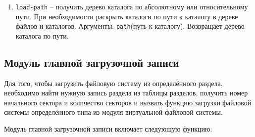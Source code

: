 \begin{enumerate}
	\begin{enumerate}
		\item \texttt{name} -- название файла;
		\item \texttt{size} -- размер файла в байтах. Для каталогов равно 0;
		\item \texttt{create-date} -- дата создания файла, если нет в конкретной файловой системе, то равно \texttt{nil};
		\item \texttt{create-time} -- время создания файла, если нет в конкретной файловой системе, то равно \texttt{nil};
		\item \texttt{modify-date} -- дата последнего изменения файла, если нет в конкретной файловой системе, то равно \texttt{nil};
		\item \texttt{modify-time} -- время последнего изменения файла, если нет в конкретной файловой системе, то равно \texttt{nil};
		\item \texttt{access-date} -- дата последнего доступа файла, если нет в конкретной файловой системе, то равно \texttt{nil};
		\item \texttt{access-time} -- время последнего изменения файла, если нет в конкретной файловой системе, то равно \texttt{nil};
		\item \texttt{dir} -- флаг, показывающий, является ли файл каталогом;
		\item другие атрибуты, которые зависят от конкретной файловой системы.
	\end{enumerate}
	
	\item \texttt{load-path} -- получить дерево каталога по абсолютному или относительному пути. При необходимости раскрыть каталоги по пути к каталогу в дереве файлов и каталогов. Аргументы: \texttt{path}(путь к каталогу). Возвращает дерево каталога по пути.
		
\end{enumerate}

\subsection{Модуль главной загрузочной записи}

Для того, чтобы загрузить файловую систему из определённого раздела, необходимо найти нужную запись раздела из таблицы разделов, получить номер начального сектора и количество секторов и вызвать функцию загрузки файловой системы определённого типа из модуля виртуальной файловой системы.

Модуль главной загрузочной записи включает следующую функцию:

